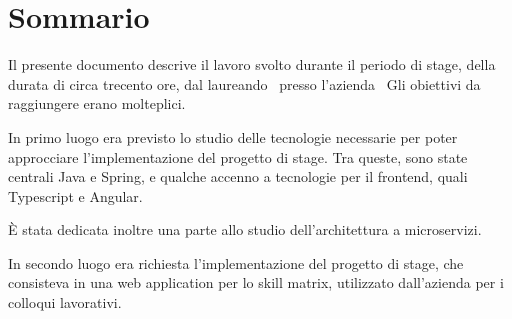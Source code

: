 
\cleardoublepage
{}
{}
\begingroup
\let\clearpage\relax
\let\cleardoublepage\relax
\let\cleardoublepage\relax

\chapter*{Sommario}

Il presente documento descrive il lavoro svolto durante il periodo di stage, della durata di circa trecento ore, dal laureando \myName\ presso l'azienda \myCompany\
Gli obiettivi da raggiungere erano molteplici.

In primo luogo era previsto lo studio delle tecnologie necessarie per poter approcciare l'implementazione del progetto di stage. Tra queste, sono state centrali
Java e Spring, e qualche accenno a tecnologie per il frontend, quali Typescript e Angular.

È stata dedicata inoltre una parte allo studio dell'architettura a microservizi.

In secondo luogo era richiesta l'implementazione del progetto di stage, che consisteva in una web application per lo skill matrix, utilizzato dall'azienda per i colloqui
lavorativi.

%
%

\endgroup

\vfill
